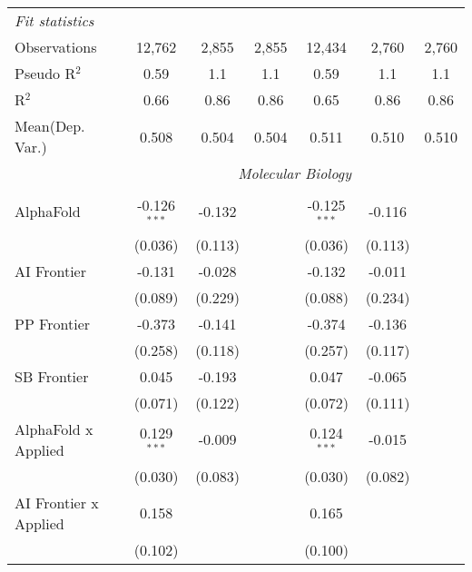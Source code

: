 \begin{tabular}{lcccccc}
   \midrule
   \emph{Fit statistics}\\
   Observations                   & 12,762         & 2,855   & 2,855         & 12,434         & 2,760   & 2,760\\  
   Pseudo R$^2$                   & 0.59           & 1.1     & 1.1           & 0.59           & 1.1     & 1.1\\  
   R$^2$                          & 0.66           & 0.86    & 0.86          & 0.65           & 0.86    & 0.86\\  
Mean(Dep. Var.) & 0.508 & 0.504 & 0.504 & 0.511 & 0.510 & 0.510 \\
   
 & \multicolumn{6}{c}{\textit{Molecular Biology}} \\ \\
   AlphaFold                    & -0.126$^{***}$ & -0.132  &               & -0.125$^{***}$ & -0.116  &   \\   
                                & (0.036)        & (0.113) &               & (0.036)        & (0.113) &   \\   
   AI Frontier                  & -0.131         & -0.028  &               & -0.132         & -0.011  &   \\   
                                & (0.089)        & (0.229) &               & (0.088)        & (0.234) &   \\   
   PP Frontier                  & -0.373         & -0.141  &               & -0.374         & -0.136  &   \\   
                                & (0.258)        & (0.118) &               & (0.257)        & (0.117) &   \\   
   SB Frontier                  & 0.045          & -0.193  &               & 0.047          & -0.065  &   \\   
                                & (0.071)        & (0.122) &               & (0.072)        & (0.111) &   \\   
   AlphaFold x Applied          & 0.129$^{***}$  & -0.009  &               & 0.124$^{***}$  & -0.015  &   \\   
                                & (0.030)        & (0.083) &               & (0.030)        & (0.082) &   \\   
   AI Frontier x Applied        & 0.158          &         &               & 0.165          &         &   \\   
                                & (0.102)        &         &               & (0.100)        &         &   \\   

\end{tabular}
